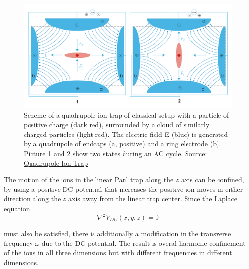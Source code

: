 \documentclass[../main.tex]{subfiles}
\begin{document}
\begin{figure}[!ht]
    \centering
    \includegraphics[scale = 0.18]{images/1920px-Paul-Trap.svg.png}
    \caption{Scheme of a quadrupole ion trap of classical setup with a particle of positive charge (dark red), surrounded by a cloud of similarly charged particles (light red). The electric field E (blue) is generated by a quadrupole of endcaps (a, positive) and a ring electrode (b). Picture 1 and 2 show two states during an AC cycle. Source: \href{https://en.wikipedia.org/wiki/Quadrupole_ion_trap}{Quadrupole Ion Trap}}
\end{figure}

\par
The motion of the ions in the linear Paul trap along the $z$ axis can be confined, by using a positive DC potential that increases the positive ion moves in either direction along the $z$ axis away from the linear trap center. Since the Laplace equation 
\begin{equation}
    \nabla^2 V_{DC}(x,y,z) = 0
\end{equation}

\noindent must also be satisfied, there is additionally a modification in the transverse frequency $\omega$ due to the DC potential. The result is overal harmonic confinement of the ions in all three dimensions but with different frequencies in different dimensions. 
\end{document}
